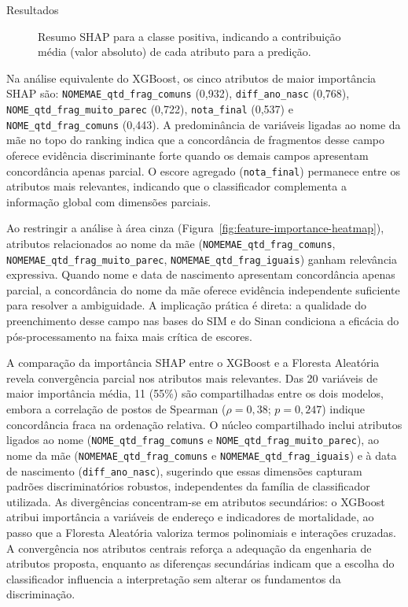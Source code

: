 \begin{chapter}{Resultados}


\begin{figure}[!ht]
\centering
\resizebox{\textwidth}{!}{}
\caption{Resumo SHAP para a classe positiva, indicando a contribuição média (valor absoluto) de cada atributo para a predição.}
\label{fig:shap-summary}
\end{figure}

\begin{sloppypar}
Na análise equivalente do XGBoost, os cinco atributos de maior importância SHAP são: \texttt{NOMEMAE\_qtd\_frag\_comuns} (0,932), \texttt{diff\_ano\_nasc} (0,768), \texttt{NOME\_qtd\_frag\_muito\_parec} (0,722), \texttt{nota\_final} (0,537) e \texttt{NOME\_qtd\_frag\_comuns} (0,443). A predominância de variáveis ligadas ao nome da mãe no topo do ranking indica que a concordância de fragmentos desse campo oferece evidência discriminante forte quando os demais campos apresentam concordância apenas parcial. O escore agregado (\texttt{nota\_final}) permanece entre os atributos mais relevantes, indicando que o classificador complementa a informação global com dimensões parciais.

Ao restringir a análise à área cinza (Figura~\ref{fig:feature-importance-heatmap}), atributos relacionados ao nome da mãe (\texttt{NOMEMAE\_qtd\_frag\_comuns}, \texttt{NOMEMAE\_qtd\_frag\_muito\_parec}, \texttt{NOMEMAE\_qtd\_frag\_iguais}) ganham relevância expressiva. Quando nome e data de nascimento apresentam concordância apenas parcial, a concordância do nome da mãe oferece evidência independente suficiente para resolver a ambiguidade. A implicação prática é direta: a qualidade do preenchimento desse campo nas bases do SIM e do Sinan condiciona a eficácia do pós-processamento na faixa mais crítica de escores.
\end{sloppypar}

A comparação da importância SHAP entre o XGBoost e a Floresta Aleatória revela convergência parcial nos atributos mais relevantes. Das 20 variáveis de maior importância média, 11 (55\%) são compartilhadas entre os dois modelos, embora a correlação de postos de Spearman ($\rho = 0{,}38$; $p = 0{,}247$) indique concordância fraca na ordenação relativa. O núcleo compartilhado inclui atributos ligados ao nome (\texttt{NOME\_qtd\_frag\_comuns} e \texttt{NOME\_qtd\_frag\_muito\allowbreak\_parec}), ao nome da mãe (\texttt{NOMEMAE\_qtd\_frag\_comuns} e \texttt{NOMEMAE\_qtd\_frag\_iguais}) e à data de nascimento (\texttt{diff\_ano\_nasc}), sugerindo que essas dimensões capturam padrões discriminatórios robustos, independentes da família de classificador utilizada. As divergências concentram-se em atributos secundários: o XGBoost atribui importância a variáveis de endereço e indicadores de mortalidade, ao passo que a Floresta Aleatória valoriza termos polinomiais e interações cruzadas. A convergência nos atributos centrais reforça a adequação da engenharia de atributos proposta, enquanto as diferenças secundárias indicam que a escolha do classificador influencia a interpretação sem alterar os fundamentos da discriminação.


\end{chapter}

